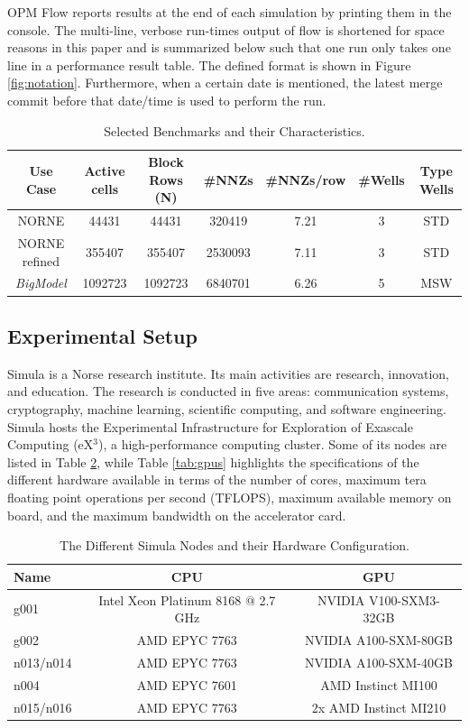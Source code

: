 OPM Flow reports results at the end of each simulation by printing them in the console. The multi-line, verbose run-times output of flow is shortened for space reasons in this paper and is summarized below such that one run only takes one line in a performance result table. The defined format is shown in Figure \ref{fig:notation}. Furthermore, when a certain date is mentioned, the latest merge commit before that date/time is used to perform the run.

\begin{table}[!t]
\centering
\begin{tabular}{c|c|c|c|c|c|c}
Use Case & Active cells & Block Rows (N) & \#NNZs & \#NNZs/row & \#Wells & Type Wells\\ \hline
NORNE  & 44431 &  44431 & 320419 & 7.21 & 3 & STD \\
NORNE refined  & 355407 &  355407 & 2530093 & 7.11 & 3 & STD \\
\textit{BigModel} & 1092723 &  1092723 & 6840701 & 6.26 & 5 & MSW \\
\end{tabular}
\caption{Selected Benchmarks and their Characteristics.}
\label{table:benchmarks}
\end{table}


\subsection{Experimental Setup}

Simula\cite{simula1} is a Norse research institute. Its main activities are research, innovation, and education. The research is conducted in five areas: communication systems, cryptography, machine learning, scientific computing, and software engineering. Simula hosts the Experimental Infrastructure for Exploration of Exascale Computing\cite{simula2,simula4} (eX$^3$), a high-performance computing cluster. Some of its nodes are listed in Table \ref{tab:simula_nodes}, while Table \ref{tab:gpus} highlights the specifications of the different hardware available in terms of the number of cores, maximum tera floating point operations per second (TFLOPS), maximum available memory on board, and the maximum bandwidth on the accelerator card. 

\begin{table}[!t]
\centering
\begin{tabular}{l|c|c}
Name      & CPU & GPU \\ \hline
g001      & Intel Xeon Platinum 8168 @ 2.7 GHz & NVIDIA V100-SXM3-32GB \\
g002      & AMD EPYC 7763 & NVIDIA A100-SXM-80GB \\
n013/n014 & AMD EPYC 7763 & NVIDIA A100-SXM-40GB \\
n004      & AMD EPYC 7601 & AMD Instinct MI100 \\
n015/n016 & AMD EPYC 7763 & 2x AMD Instinct MI210 \\
\end{tabular}
\caption{The Different Simula Nodes and their Hardware Configuration.}
\label{tab:simula_nodes}
\end{table}

